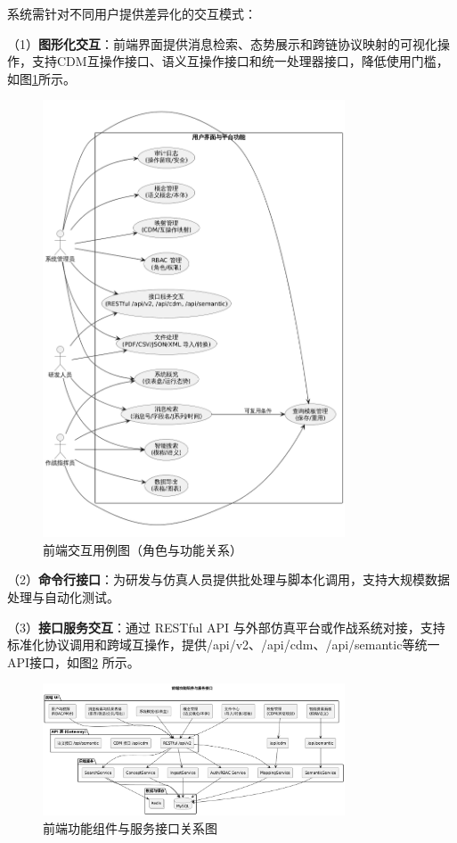 系统需针对不同用户提供差异化的交互模式\cite{reid_2018_nav_leo}：

（1）\textbf{图形化交互}：前端界面提供消息检索、态势展示和跨链协议映射的可视化操作，支持CDM互操作接口、语义互操作接口和统一处理器接口，降低使用门槛，如图\ref{fig_usecase_frontend}所示。
\begin{figure}[H]
    \centering
    \includegraphics[width=0.8\textwidth,height=0.5\textheight,keepaspectratio]{chapters/fig-0/usecase_frontend.png}
    \caption{前端交互用例图（角色与功能关系）}
    \label{fig_usecase_frontend}
  \end{figure}
（2）\textbf{命令行接口}：为研发与仿真人员提供批处理与脚本化调用，支持大规模数据处理与自动化测试。

（3）\textbf{接口服务交互}：通过 RESTful API 与外部仿真平台或作战系统对接，支持标准化协议调用和跨域互操作，提供/api/v2、/api/cdm、/api/semantic等统一API接口，如图\ref{fig_component_frontend} 所示。



\begin{figure}[H]
  \centering
  \includegraphics[width=0.8\textwidth,height=0.5\textheight,keepaspectratio]{chapters/fig-0/component_frontend.png}
  \caption{前端功能组件与服务接口关系图}
  \label{fig_component_frontend}
\end{figure}


